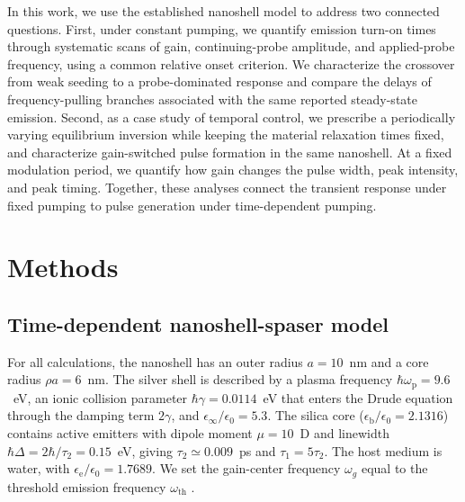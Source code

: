 \documentclass{optica-article}
\begin{document}
\begin{revision}
In this work, we use the established nanoshell model to address two connected questions. First, under constant pumping, we quantify emission turn-on times through systematic scans of gain, continuing-probe amplitude, and applied-probe frequency, using a common relative onset criterion. We characterize the crossover from weak seeding to a probe-dominated response and compare the delays of frequency-pulling branches associated with the same reported steady-state emission. Second, as a case study of temporal control, we prescribe a periodically varying equilibrium inversion while keeping the material relaxation times fixed, and characterize gain-switched pulse formation in the same nanoshell. At a fixed modulation period, we quantify how gain changes the pulse width, peak intensity, and peak timing. Together, these analyses connect the transient response under fixed pumping to pulse generation under time-dependent pumping.
\end{revision}

\section{Methods}
\label{sec:methods}
\label{sec:theory}

\subsection{Time-dependent nanoshell-spaser model}
\label{sec:dynamic_model}

For all calculations, the nanoshell has an outer radius $a=10$~nm and a core radius $\rho a=6$~nm. The silver shell is described by a plasma frequency $\hbar\omega_{\mathrm{p}}=9.6$~eV, an ionic collision parameter $\hbar\gamma=0.0114$~eV that enters the Drude equation through the damping term $2\gamma$, and $\epsilon_{\infty}/\epsilon_0=5.3$. The silica core ($\epsilon_{\mathrm{b}}/\epsilon_0=2.1316$) contains active emitters with dipole moment $\mu=10$~D and linewidth $\hbar\Delta=2\hbar/\tau_2=0.15$~eV, giving $\tau_2\simeq0.009$~ps and $\tau_1=5\tau_2$. The host medium is water, with $\epsilon_{\mathrm{e}}/\epsilon_0=1.7689$. We set the gain-center frequency $\omega_g$ equal to the threshold emission frequency $\omega_{\mathrm{th}}$ \cite{Caicedo:2025}.
\end{document}

